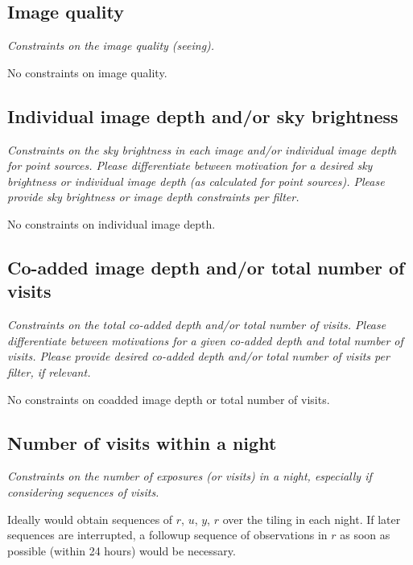 \documentclass[11pt]{article}
\begin{document}
\subsection{Image quality}
\begin{footnotesize}{\it Constraints on the image quality (seeing).}\end{footnotesize}

No constraints on image quality.

\subsection{Individual image depth and/or sky brightness}
\begin{footnotesize}{\it Constraints on the sky brightness in each image and/or individual image depth for point sources.
Please differentiate between motivation for a desired sky brightness or individual image depth (as 
calculated for point sources). Please provide sky brightness or image depth constraints per filter.}
\end{footnotesize}

No constraints on individual image depth. 

\subsection{Co-added image depth and/or total number of visits}
\begin{footnotesize}{\it  Constraints on the total co-added depth and/or total number of visits.
Please differentiate between motivations for a given co-added depth and total number of visits. 
Please provide desired co-added depth and/or total number of visits per filter, if relevant.}
\end{footnotesize}

No constraints on coadded image depth or total number of visits.

\subsection{Number of visits within a night}
\begin{footnotesize}{\it Constraints on the number of exposures (or visits) in a night, especially if considering sequences of visits.  }
\end{footnotesize}

Ideally would obtain sequences of $r$, $u$, $y$, $r$ over the tiling in each night. If later sequences are interrupted, a
followup sequence of observations in $r$ as soon as possible (within 24 hours) would be necessary. 
\end{document}
